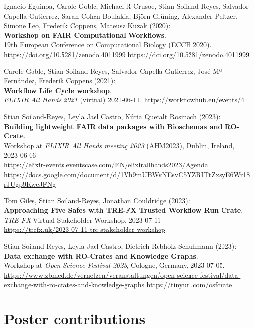Ignacio Eguinoa, Carole Goble, Michael R Crusoe, Stian Soiland-Reyes, Salvador Capella-Gutierrez, Sarah Cohen-Boulakia, Björn Grüning, Alexander Peltzer, Simone Leo, Frederik Coppens, Mateusz Kuzak (2020):\\
\textbf{{Workshop on FAIR Computational Workflows}}.\\
19th European Conference on Computational Biology ({ECCB 2020}).\\
\url{https://doi.org/10.5281/zenodo.4011999}
https://doi.org/10.5281/zenodo.4011999


Carole Goble, Stian Soiland-Reyes, Salvador Capella-Gutierrez, José Mª Fernández, Frederik Coppens (2021):\\
\textbf{Workflow Life Cycle workshop}.\\
\emph{ELIXIR All Hands 2021} (virtual) 2021-06-11.
\url{https://workflowhub.eu/events/4}

Stian Soiland-Reyes, Leyla Jael Castro, Núria Queralt Rosinach (2023):\\
\textbf{Building lightweight FAIR data packages with Bioschemas and RO-Crate}.\\
Workshop at \emph{ELIXIR All Hands meeting 2023} (AHM2023), Dublin, Ireland, 2023-06-06 \\
\url{https://elixir-events.eventscase.com/EN/elixirallhands2023/Agenda}
\url{https://docs.google.com/document/d/1Vh9mUBWvNEsvC5YZRITtZxsyE6Wr18rJUgp9KweJFNg}

Tom Giles, Stian Soiland-Reyes, Jonathan Couldridge (2023):\\
\textbf{Approaching Five Safes with TRE-FX Trusted Workflow Run Crate}.\\
\emph{TRE-FX} Virtual Stakeholder Workshop, 2023-07-11 \\
\url{https://trefx.uk/2023-07-11-tre-stakeholder-workshop}

Stian Soiland-Reyes, Leyla Jael Castro, Dietrich Rebholz-Schuhmann (2023):\\
\textbf{Data exchange with RO-Crates and Knowledge Graphs}.\\
Workshop at \emph{Open Science Festival 2023}, Cologne, Germany, 2023-07-05.\\
\url{https://www.zbmed.de/vernetzen/veranstaltungen/open-science-festival/data-exchange-with-ro-crates-and-knowledge-graphs} 
\url{https://tinyurl.com/osfcrate}


\section{Poster contributions}


